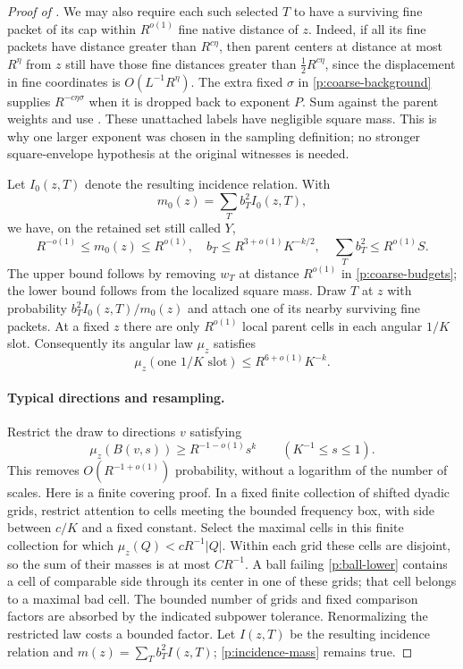\begin{proof}[Proof of ]
We may also require each such selected $T$ to have a surviving fine packet
of its cap within $R^{o(1)}$ fine native distance of $z$.
Indeed, if all its fine packets have distance greater than $R^{c\eta}$,
then parent centers at distance at most $R^\eta$ from $z$ still have those
fine distances greater than $\tfrac12R^{c\eta}$, since the displacement in
fine coordinates is $O(L^{-1}R^\eta)$.  The extra fixed $\sigma$ in
\eqref{p:coarse-background} supplies $R^{-c\eta\sigma}$ when it is dropped
back to exponent $P$.  Sum against the parent weights and use
.  These unattached labels have negligible square mass.
This is why one larger exponent was chosen in the sampling definition; no
stronger square-envelope hypothesis at the original witnesses is needed.

Let $I_0(z,T)$ denote the resulting incidence relation.  With
\[
 m_0(z)=\sum_Tb_T^2I_0(z,T),
\]
we have, on the retained set still called $Y$,
\begin{equation}\label{p:incidence-mass}
 R^{-o(1)}\leq m_0(z)\leq R^{o(1)},\quad
 b_T\leq R^{3+o(1)}K^{-k/2},\quad
 \sum_Tb_T^2\leq R^{o(1)}S.
\end{equation}
The upper bound follows by removing $w_T$ at distance $R^{o(1)}$ in
\eqref{p:coarse-budgets}; the lower bound follows from the localized square
mass.  Draw $T$ at $z$ with probability $b_T^2I_0(z,T)/m_0(z)$ and attach
one of its nearby surviving fine packets.  At a fixed $z$ there are only
$R^{o(1)}$ local parent cells in each angular $1/K$ slot.  Consequently its
angular law $\mu_z$ satisfies
\begin{equation}\label{p:slot-upper}
 \mu_z(\text{one }1/K\text{ slot})\leq R^{6+o(1)}K^{-k}.
\end{equation}

\paragraph{Typical directions and resampling.}
Restrict the draw to directions $v$ satisfying
\begin{equation}\label{p:ball-lower}
 \mu_z(B(v,s))\geq R^{-1-o(1)}s^k
 \qquad(K^{-1}\leq s\leq1).
\end{equation}
This removes $O(R^{-1+o(1)})$ probability, without a logarithm of the number
of scales.  Here is a finite covering proof.  In a fixed finite collection
of shifted dyadic grids, restrict attention to cells meeting the bounded
frequency box, with side between $c/K$ and a fixed constant.  Select the
maximal cells in this finite collection for which
$\mu_z(Q)<cR^{-1}|Q|$.  Within each grid these cells are disjoint, so the
sum of their masses is at most $CR^{-1}$.  A ball failing
\eqref{p:ball-lower} contains a cell of comparable side through its center
in one of these grids; that cell belongs to a maximal bad cell.  The bounded
number of grids and fixed comparison factors are absorbed by the indicated
subpower tolerance.  Renormalizing the restricted law costs a bounded
factor.  Let $I(z,T)$ be the resulting incidence relation and
$m(z)=\sum_Tb_T^2I(z,T)$; \eqref{p:incidence-mass} remains true.


\end{proof}
